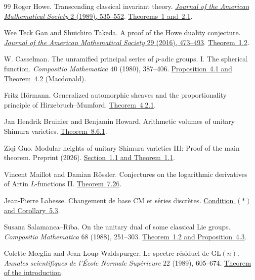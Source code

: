 \begin{thebibliography}{99}
Roger Howe.
Transcending classical invariant theory.
\href{https://doi.org/10.1090/S0894-0347-1989-0985172-6}{\emph{Journal
of the American Mathematical Society} 2 (1989), 535--552}.
\href{https://www.math.utah.edu/~ptrapa/math-library/howe/howe-transcending-1989.pdf}{Theorems~1 and~2.1}.

Wee Teck Gan and Shuichiro Takeda.
A proof of the Howe duality conjecture.
\href{https://doi.org/10.1090/jams/839}{\emph{Journal of the American
Mathematical Society} 29 (2016), 473--493}.
\href{https://arxiv.org/pdf/1407.1995v4}{Theorem~1.2}.

W. Casselman.
The unramified principal series of \(p\)-adic groups. I. The spherical
function. \emph{Compositio Mathematica} 40 (1980), 387--406.
\href{https://www.numdam.org/article/CM_1980__40_3_387_0.pdf\#page=18}{Proposition~4.1 and Theorem~4.2 (Macdonald)}.

Fritz H\"ormann.
Generalized automorphic sheaves and the proportionality principle of
Hirzebruch--Mumford.
\href{https://arxiv.org/pdf/1603.04411v2\#page=32}{Theorem~4.2.1}.

Jan Hendrik Bruinier and Benjamin Howard.
Arithmetic volumes of unitary Shimura varieties.
\href{https://arxiv.org/pdf/2105.11274v3\#page=117}{Theorem~8.6.1}.

Ziqi Guo.
Modular heights of unitary Shimura varieties III: Proof of the main
theorem. Preprint (2026).
\href{https://arxiv.org/pdf/2606.19158v4\#page=4}{Section~1.1 and Theorem~1.1}.

Vincent Maillot and Damian R\"ossler.
Conjectures on the logarithmic derivatives of Artin \(L\)-functions II.
\href{https://arxiv.org/pdf/1808.03068v1\#page=41}{Theorem~7.26}.

Jean-Pierre Labesse.
Changement de base CM et s\'eries discr\`etes.
\href{https://webusers.imj-prg.fr/~michael.harris/CBCM.pdf\#page=42}
{Condition \((*)\) and Corollary~5.3}.

Susana Salamanca--Riba.
On the unitary dual of some classical Lie groups.
\emph{Compositio Mathematica} 68 (1988), 251--303.
\href{https://www.numdam.org/item/CM_1988__68_3_251_0.pdf\#page=4}
{Theorem~1.2 and Proposition~4.3}.

Colette M\oe glin and Jean-Loup Waldspurger.
Le spectre r\'esiduel de \(\mathrm{GL}(n)\).
\emph{Annales scientifiques de l'\'Ecole Normale Sup\'erieure}
22 (1989), 605--674.
\href{https://www.numdam.org/item/ASENS_1989_4_22_4_605_0.pdf\#page=3}
{Theorem of the introduction}.


\end{thebibliography}
